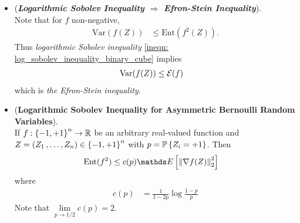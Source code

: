 \documentclass[11pt]{article}
\begin{document}
\begin{itemize}
\begin{proof}
Define 
\begin{align*}
h(a) := \frac{1}{2}a^2\log a^2 + \frac{1}{2}b^2\log b^2 - \frac{1}{2}(a^2 + b^2)\log\paren{\frac{a^2 + b^2}{2}} -  \frac{1}{2}\paren{a - b}^2 
\end{align*} for $a \in [b, \infty)$. $h(b) = 0$. It suffice to check that $h'(b) = 0$ and that $h$ is concave on $[b, \infty)$.
Note that
\begin{align*}
h'(a) &= a\log a^2 + 1 - a\log\paren{\frac{a^2 + b^2}{2}} - 1 - (a-b)\\
&= a\log\frac{2a^2}{(a^2 + b^2)} - (a-b).
\end{align*} So $h'(b) = 0$. Moreover, 
\begin{align*}
h''(a) &= \log\frac{2a^2}{(a^2 + b^2)} + 1 - \frac{2a^2}{(a^2 + b^2)} \le 0
\end{align*} due to inequality $\log(x) + 1 \le x$. \qed
\end{proof}

\item \begin{remark} (\emph{\textbf{Logarithmic Sobolev Inequality $\Rightarrow$  Efron-Stein Inequality}}). \citep{boucheron2013concentration}\\
Note that for $f$ non-negative, 
\begin{align*}
\text{Var}(f(Z)) &\le \text{Ent}(f^2(Z)).
\end{align*} Thus \emph{logarithmic Sobolev inequality} \eqref{ineqn: log_sobolev_inequality_binary_cube} implies
\begin{align*}
\text{Var}(f(Z)) &\le  {\mathcal E}(f) 
\end{align*} which is \emph{the Efron-Stein inequality}.
\end{remark}

\item \begin{corollary} (\textbf{Logarithmic Sobolev Inequality for Asymmetric Bernoulli Random Variables}). \citep{boucheron2013concentration}\\
If $f: \left\{-1, +1\right\}^n \to {\mathbb R}$ be an arbitrary real-valued function and $Z = (Z_1 \,{,}\ldots{,}\, Z_n) \in \left\{-1, +1\right\}^n$ with $p= {\mathbb P}\left\{Z_i = +1\right\}$. Then
\begin{align}
\text{Ent}(f^2) &\le c(p)\E{}{\norm{\nabla f(Z)}{2}^2}   \label{ineqn: log_sobolev_inequality_binary_cube_asym}
\end{align} where 
\begin{align*}
c(p) &= \frac{1}{1 - 2p}\log\frac{1-p}{p}
\end{align*} Note that $\lim\limits_{p \to 1/2}c(p) = 2$.
\end{corollary}
\end{itemize}
\end{document}
